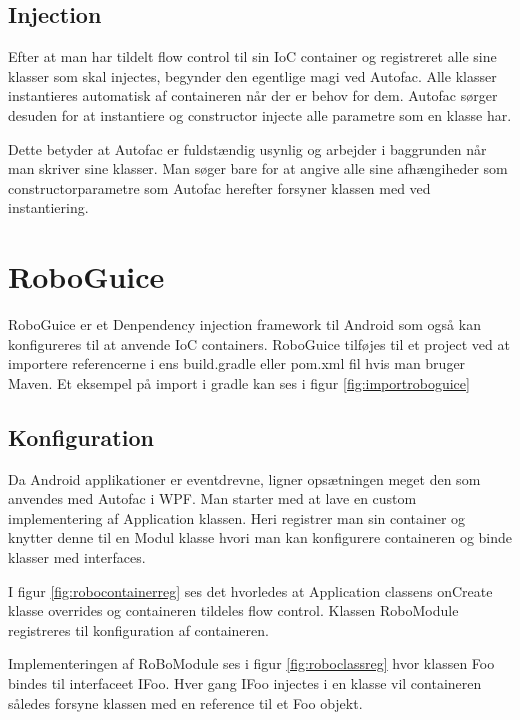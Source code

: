 \subsection{Injection}
Efter at man har tildelt flow control til sin IoC container og registreret alle sine klasser som skal injectes, begynder den egentlige magi ved Autofac. Alle klasser instantieres automatisk af containeren når der er behov for dem. Autofac sørger desuden for at instantiere og constructor injecte alle parametre som en klasse har.

Dette betyder at Autofac er fuldstændig usynlig og arbejder i baggrunden når man skriver sine klasser. Man søger bare for at angive alle sine afhængiheder som constructorparametre som Autofac herefter forsyner klassen med ved instantiering.

\section{RoboGuice}
RoboGuice er et Denpendency injection framework til Android som også kan konfigureres til at anvende IoC containers. RoboGuice tilføjes til et project ved at importere referencerne i ens build.gradle eller pom.xml fil hvis man bruger Maven. Et eksempel på import i gradle kan ses i figur \ref{fig:importroboguice}


\FloatBarrier
\subsection{Konfiguration}
Da Android applikationer er eventdrevne, ligner opsætningen meget den som anvendes med Autofac i WPF. Man starter med at lave en custom implementering af Application klassen. Heri registrer man sin container og knytter denne til en Modul klasse hvori man kan konfigurere containeren og binde klasser med interfaces.

I figur \ref{fig:robocontainerreg} ses det hvorledes at Application classens onCreate klasse overrides og containeren tildeles flow control. Klassen RoboModule registreres til konfiguration af containeren.


Implementeringen af RoBoModule ses i figur \ref{fig:roboclassreg} hvor klassen Foo bindes til interfaceet IFoo. Hver gang IFoo injectes i en klasse vil containeren således forsyne klassen med en reference til et Foo objekt.

